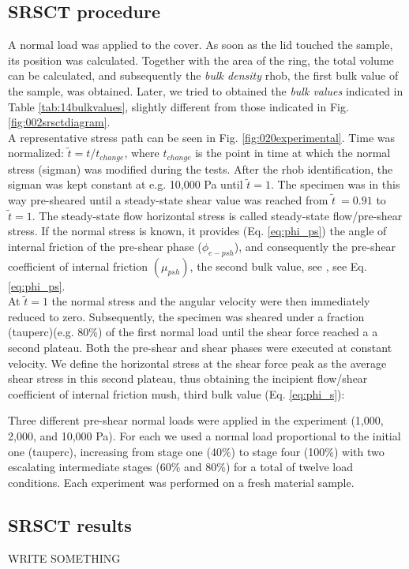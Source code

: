 \subsection{SRSCT procedure}
\label{subsec:srsctprocedure}

A normal load was applied to the cover. As soon as the lid touched the sample,
its position was calculated.
Together with the area of the ring, the total volume can be calculated, and subsequently the 
\textit{bulk density} \acs{rhob}, the first bulk value
of the sample, was obtained.
Later, we tried to obtained the \textit{bulk values} indicated in Table
\ref{tab:14bulkvalues}, slightly different from those indicated in Fig.
\ref{fig:002srsctdiagram}.\\
A representative stress path can be seen in Fig. \ref{fig:020experimental}.
Time was normalized: $\tilde{t} = t/t_{change}$, where $t_{change}$ is the
point in time at which the normal stress (\acs{sigman}) was modified during the	tests.
After the \acs{rhob} identification, the \acs{sigman} was kept constant at e.g.
10,000 Pa until $\tilde{t}=1$.
The specimen was in this way pre-sheared until a steady-state shear value was
reached from $\tilde{t}~=0.91$ to $\tilde{t}=1$.
The steady-state flow horizontal stress
is called steady-state flow/pre-shear stress.
If the normal stress is known, it provides (Eq. \ref{eq:phi_ps}) the angle of
internal friction of the pre-shear phase ($\phi_{e-psh}$), and consequently the
pre-shear coefficient of internal friction $ (\mu_{psh})$, the second
bulk value, see \citet{RefWorks:118}, see Eq. \ref{eq:phi_ps}.\\
At $\tilde{t}=1$ the normal stress and the angular velocity were then
immediately reduced to zero.
Subsequently, the specimen was sheared under a fraction (\acs{tauperc})(e.g.
80\%) of the first normal load until the shear force reached a a second plateau.
Both the pre-shear and shear phases were executed at constant velocity. 
We define the horizontal stress at the shear force peak as the average shear
stress in this second plateau, thus obtaining the incipient flow/shear
coefficient of internal friction \acs{mush}, third bulk value (Eq. \ref{eq:phi_s})\cite{RefWorks:118}:

Three different pre-shear normal loads were applied in the experiment
(1,000, 2,000, and 10,000 Pa).
For each we used a normal load proportional to the initial one
(\acs{tauperc}), increasing from stage one (40\%) to stage four (100\%)
with two escalating intermediate stages (60\% and 80\%) for a total of twelve load conditions.
Each experiment was performed on a fresh material sample. \\


\subsection{SRSCT results}
\label{subsec:srsctresults}

WRITE SOMETHING